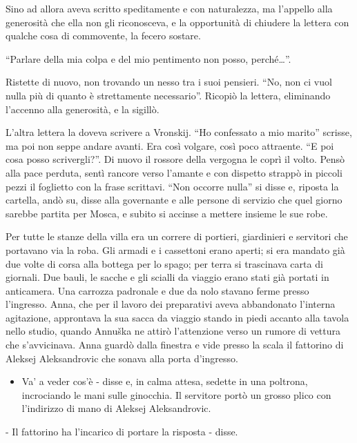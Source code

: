 Sino ad allora aveva scritto speditamente e con naturalezza, ma l'appello alla generosità che ella non gli riconosceva, e la opportunità di chiudere la lettera con qualche cosa di commovente, la fecero sostare. 

``Parlare della mia colpa e del mio pentimento non posso, perché\ldots{}''. 

Ristette di nuovo, non trovando un nesso tra i suoi pensieri. ``No, non ci vuol nulla più di quanto è strettamente necessario''. Ricopiò la lettera, eliminando l'accenno alla generosità, e la sigillò. 

L'altra lettera la doveva scrivere a Vronskij. ``Ho confessato a mio marito'' scrisse, ma poi non seppe andare avanti. Era così volgare, così poco attraente. ``E poi cosa posso scrivergli?''. Di nuovo il rossore della vergogna le coprì il volto. Pensò alla pace perduta, sentì rancore verso l'amante e con dispetto strappò in piccoli pezzi il foglietto con la frase scrittavi. ``Non occorre nulla'' si disse e, riposta la cartella, andò su, disse alla governante e alle persone di servizio che quel giorno sarebbe partita per Mosca, e subito si accinse a mettere insieme le sue robe. 

Per tutte le stanze della villa era un correre di portieri, giardinieri e servitori che portavano via la roba. Gli armadi e i cassettoni erano aperti; si era mandato già due volte di corsa alla bottega per lo spago; per terra si trascinava carta di giornali. Due bauli, le sacche e gli scialli da viaggio erano stati già portati in anticamera. Una carrozza padronale e due da nolo stavano ferme presso l'ingresso. Anna, che per il lavoro dei preparativi aveva abbandonato l'interna agitazione, approntava la sua sacca da viaggio stando in piedi accanto alla tavola nello studio, quando Annuška ne attirò l'attenzione verso un rumore di vettura che s'avvicinava. Anna guardò dalla finestra e vide presso la scala il fattorino di Aleksej Aleksandrovic che sonava alla porta d'ingresso. 

\begin{itemize} \itemsep1pt\parskip0pt \item Va' a veder cos'è - disse e, in calma attesa, sedette in una poltrona, incrociando le mani sulle ginocchia. Il servitore portò un grosso plico con l'indirizzo di mano di Aleksej Aleksandrovic. \end{itemize} 

- Il fattorino ha l'incarico di portare la risposta - disse. 

